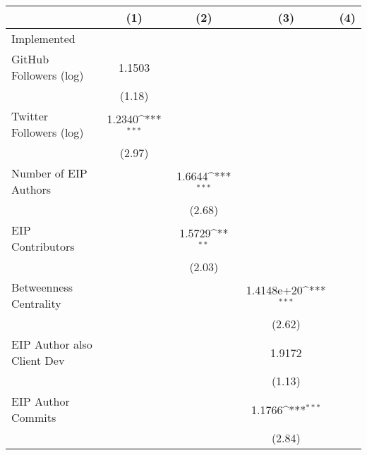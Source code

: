 {
\def\sym#1{\ifmmode^{#1}\else\(^{#1}\)\fi}
\begin{tabular}{l*{4}{c}}
\hline\hline
                                   &\multicolumn{1}{c}{(1)}         &\multicolumn{1}{c}{(2)}         &\multicolumn{1}{c}{(3)}         &\multicolumn{1}{c}{(4)}         \\
\hline
Implemented                        &                   &                   &                   &                   \\
GitHub Followers (log)             &    1.1503         &                   &                   &                   \\
                                   &    (1.18)         &                   &                   &                   \\
[1em]
Twitter Followers (log)            &    1.2340\sym{***}&                   &                   &                   \\
                                   &    (2.97)         &                   &                   &                   \\
[1em]
Number of EIP Authors              &                   &    1.6644\sym{***}&                   &                   \\
                                   &                   &    (2.68)         &                   &                   \\
[1em]
EIP Contributors                   &                   &    1.5729\sym{**} &                   &                   \\
                                   &                   &    (2.03)         &                   &                   \\
[1em]
Betweenness Centrality             &                   &                   &1.4148e+20\sym{***}&                   \\
                                   &                   &                   &    (2.62)         &                   \\
[1em]
EIP Author also Client Dev         &                   &                   &    1.9172         &                   \\
                                   &                   &                   &    (1.13)         &                   \\
[1em]
EIP Author Commits                 &                   &                   &    1.1766\sym{***}&                   \\
                                   &                   &                   &    (2.84)         &                   \\

\end{tabular}}
